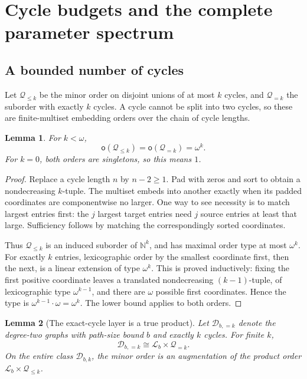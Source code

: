 \documentclass[11pt,letterpaper]{article}
\theoremstyle{plain}
\newtheorem{lemma}[lemma]{Lemma}
\theoremstyle{definition}
\theoremstyle{remark}
\newcommand{\N}{\mathbb N}
\newcommand{\mot}{\mathsf o}
\newcommand{\LF}{\mathcal L}
\newcommand{\DG}{\mathcal D}
\newcommand{\Q}{\mathcal Q}
\begin{document}
\section{Cycle budgets and the complete parameter spectrum}\label{sec:bounded}

\subsection{A bounded number of cycles}

Let $\Q_{\le k}$ be the minor order on disjoint unions of at most
$k$ cycles, and $\Q_{=k}$ the suborder with exactly $k$ cycles. A
cycle cannot be split into two cycles, so these are finite-multiset
embedding orders over the chain of cycle lengths.

\begin{lemma}\label{lem:cyclebudget}
For $k<\omega$,
\[
 \mot(\Q_{\le k})=\mot(\Q_{=k})=\omega^k.
\]
For $k=0$, both orders are singletons, so this means $1$.
\end{lemma}

\begin{proof}
Replace a cycle length $n$ by $n-2\ge1$. Pad with zeros and sort to
obtain a nondecreasing $k$-tuple. The multiset embeds into another
exactly when its padded coordinates are componentwise no larger.
One way to see necessity is to match largest entries first: the
$j$ largest target entries need $j$ source entries at least that
large. Sufficiency follows by matching the correspondingly sorted
coordinates.

Thus $\Q_{\le k}$ is an induced suborder of $\N^k$, and has maximal
order type at most $\omega^k$. For exactly $k$ entries, lexicographic
order by the smallest coordinate first, then the next, is a linear
extension of type $\omega^k$. This is proved inductively: fixing
the first positive coordinate leaves a translated nondecreasing
$(k-1)$-tuple, of lexicographic type $\omega^{k-1}$, and there are
$\omega$ possible first coordinates. Hence the type is
$\omega^{k-1}\cdot\omega=\omega^k$. The lower bound applies to
both orders.
\end{proof}

\begin{lemma}[The exact-cycle layer is a true product]\label{lem:fixedlayer}
Let $\DG_{b,=k}$ denote the degree-two graphs with path-size bound
$b$ and exactly $k$ cycles. For finite $k$,
\[
 \DG_{b,=k}\cong\LF_b\times\Q_{=k}.
\]
On the entire class $\DG_{b,k}$, the minor order is an augmentation
of the product order $\LF_b\times\Q_{\le k}$.
\end{lemma}
\end{document}
